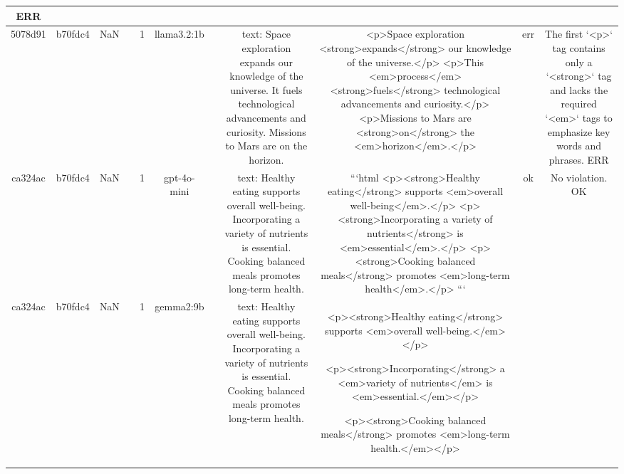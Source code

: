 \begin{table}[h!]
\begin{tabular}{|c|c|c|c|c|c|c|c|c|c|c|}
ERR\\
\hline
5078d91 & b70fdc4 & NaN &  & 1 & llama3.2:1b &  & text: Space exploration expands our knowledge of the universe. It fuels technological advancements and curiosity. Missions to Mars are on the horizon. & <p>Space exploration <strong>expands</strong> our knowledge of the universe.</p>
<p>This <em>process</em> <strong>fuels</strong> technological advancements and curiosity.</p>
<p>Missions to Mars are <strong>on</strong> the <em>horizon</em>.</p> & err & The first `<p>` tag contains only a `<strong>` tag and lacks the required `<em>` tags to emphasize key words and phrases.
ERR\\
\hline
ca324ac & b70fdc4 & NaN &  & 1 & gpt-4o-mini &  & text: Healthy eating supports overall well-being. Incorporating a variety of nutrients is essential. Cooking balanced meals promotes long-term health. & ```html
<p><strong>Healthy eating</strong> supports <em>overall well-being</em>.</p>
<p><strong>Incorporating a variety of nutrients</strong> is <em>essential</em>.</p>
<p><strong>Cooking balanced meals</strong> promotes <em>long-term health</em>.</p>
``` & ok & No violation.
OK\\
\hline
ca324ac & b70fdc4 & NaN &  & 1 & gemma2:9b &  & text: Healthy eating supports overall well-being. Incorporating a variety of nutrients is essential. Cooking balanced meals promotes long-term health. & <p><strong>Healthy eating</strong> supports <em>overall well-being.</em></p>

<p><strong>Incorporating</strong> a <em>variety of nutrients</em> is <em>essential.</em></p>

<p><strong>Cooking balanced meals</strong> promotes <em>long-term health.</em></p>   



\end{tabular}
\end{table}
